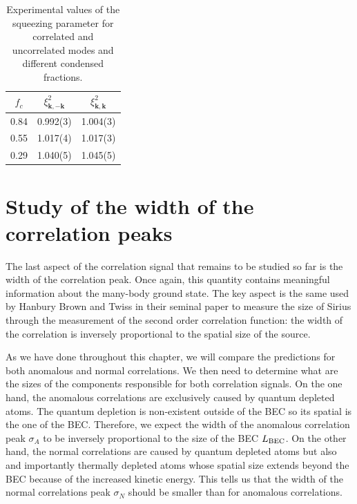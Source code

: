 \begin{table}[]
    \centering
    \begin{tabular}{|c|c|c|}
        \hline
        $f_c$ & $\xi^2_{\bm{k},-\bm{k}}$ & $\xi^2_{\bm{k},\bm{k}}$ \\
        \hline
        0.84 & 0.992(3) & 1.004(3) \\
        \hline
        0.55 & 1.017(4) & 1.017(3) \\
        \hline
        0.29 & 1.040(5) & 1.045(5) \\
        \hline
    \end{tabular}
    \caption{Experimental values of the squeezing parameter for correlated and uncorrelated modes and different condensed fractions.}
    \label{tab:squeezing}
\end{table}


\section{Study of the width of the correlation peaks}

The last aspect of the \kmk correlation signal that remains to be studied so far is the width of the correlation peak. Once again, this quantity contains meaningful information about the many-body ground state. The key aspect is the same used by Hanbury Brown and Twiss in their seminal paper to measure the size of Sirius through the measurement of the second order correlation function: the width of the correlation is inversely proportional to the spatial size of the source. 

As we have done throughout this chapter, we will compare the predictions for both anomalous and normal correlations. We then need to determine what are the sizes of the components responsible for both correlation signals. On the one hand, the anomalous correlations are exclusively caused by quantum depleted atoms. The quantum depletion is non-existent outside of the BEC so its spatial is the one of the BEC. Therefore, we expect the width of the anomalous correlation peak $\sigma_A$ to be inversely proportional to the size of the BEC $L_{\rm{BEC}}$. On the other hand, the normal correlations are caused by quantum depleted atoms but also and importantly thermally depleted atoms whose spatial size extends beyond the BEC because of the increased kinetic energy. This tells us that the width of the normal correlations peak $\sigma_N$ should be smaller than for anomalous correlations.

